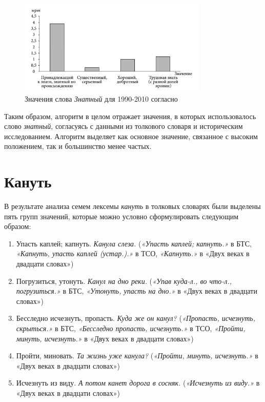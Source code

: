 \begin{figure}[H]
    \centering %
    \includegraphics[width=0.8\textwidth]{img/book/znatnij/1990-2010}
    \caption{Значения слова \textit{Знатный} для 1990-2010 согласно~\cite{TwoCenturies}}
    \label{fig:TwoCentruriesZnatniy2}
\end{figure}

Таким образом, алгоритм в целом отражает значения, в которых использовалось
слово \textit{знатный}, согласуясь с данными из толкового словаря и историческим исследованием.
Алгоритм выделяет как основное значение, связанное с высоким положением, так и большинство
менее частых.

\section*{Кануть}

В результате анализа семем лексемы \textit{кануть} в толковых словарях были выделены пять групп значений,
которые можно условно сформулировать следующим образом:

\begin{enumerate}
    \item Упасть каплей; капнуть. \textit{Канула слеза.}
    (\textit{«Упасть каплей; капнуть.»} в БТС,
    \textit{«Капнуть, упасть каплей (устар.).»} в ТСО,
    \textit{«Капнуть.»} в «Двух веках в двадцати словах»)

    \item Погрузиться, утонуть. \textit{Канул на дно реки.}
    (\textit{«Упав куда-л., во что-л., погрузиться.»} в БТС,
    \textit{«Утонуть, упасть на дно.»} в «Двух веках в двадцати словах»)

    \item Бесследно исчезнуть, пропасть. \textit{Куда же он канул?}
    (\textit{«Пропасть, исчезнуть, скрыться.»} в БТС,
    \textit{«Бесследно пропасть, исчезнуть.»} в ТСО,
    \textit{«Пройти, минуть, исчезнуть.»} в «Двух веках в двадцати словах»)

    \item Пройти, миновать. \textit{Та жизнь уже канула?}
    (\textit{«Пройти, минуть, исчезнуть.»} в «Двух веках в двадцати словах»)

    \item Исчезнуть из виду. \textit{А потом канет дорога в сосняк.}
    (\textit{«Исчезнуть из виду.»} в «Двух веках в двадцати словах»)
\end{enumerate}

